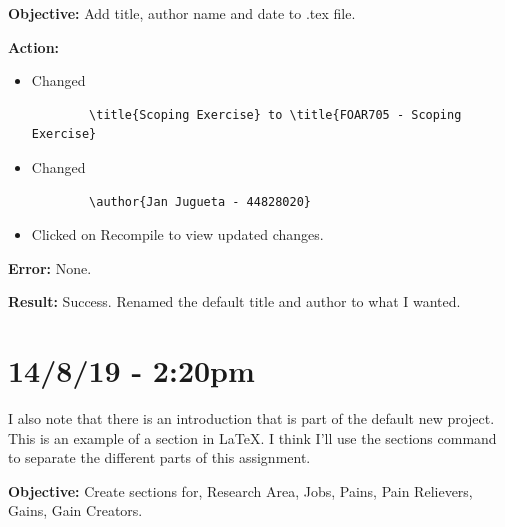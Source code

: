 \documentclass{article}
\begin{document}
\textbf{Objective:} Add title, author name and date to .tex file.

\textbf{Action:}
\begin{itemize}
    \item Changed \begin{verbatim}
        \title{Scoping Exercise} to \title{FOAR705 - Scoping Exercise}    
    \end{verbatim}
    \item Changed \begin{verbatim}
        \author{Jan Jugueta - 44828020}
    \end{verbatim}
    \item Clicked on Recompile to view updated changes.
\end{itemize}

\textbf{Error:} None.

\textbf{Result:} Success. Renamed the default title and author to what I wanted.

\section*{14/8/19 - 2:20pm}

I also note that there is an introduction that is part of the default new project. This is an example of a section in LaTeX. I think I’ll use the sections command to separate the different parts of this assignment.

\textbf{Objective:} Create sections for, Research Area, Jobs, Pains, Pain Relievers, Gains, Gain Creators.
\end{document}
